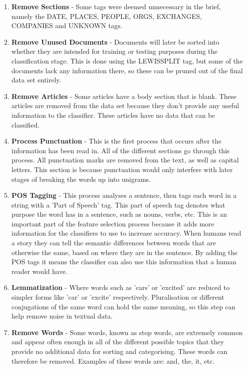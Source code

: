 \documentclass[11pt]{article}
\begin{document}
\begin{enumerate}
\item \textbf{Remove Sections} - Some tags were deemed unnecessary in the brief, namely the DATE, PLACES, PEOPLE, ORGS, EXCHANGES, COMPANIES and UNKNOWN    tags.
\item \textbf{Remove Unused Documents} - Documents will later be sorted into whether they are intended for training or testing purposes during the classification stage. This is done using the LEWISSPLIT tag, but some of the documents lack any information there, so these can be pruned out of the final data set entirely.
\item \textbf{Remove Articles} - Some articles have a body section that is blank. These articles are removed from the data set because they don't provide any useful information to the classifier. These articles have no data that can be classified.
\item \textbf{Process Punctuation} - This is the first process that occurs after the information has been read in. All of the different sections go through this process. All punctuation marks are removed from the text, as well as capital letters. This section is because punctuation would only interfere with later stages of breaking the words up into unigrams.
\item \textbf{POS Tagging}  - This process analyses a sentence, then tags each word in a string with a 'Part of Speech' tag. This part of speech tag denotes what purpose the word has in a sentence, such as nouns, verbs, etc. This is an important part of the feature selection process because it adds more information for the classifiers to use to increase accuracy. When humans read a story they can tell the semantic differences between words that are otherwise the same, based on where they are in the sentence. By adding the POS tags it means the classifier can also use this information that a human reader would have.
\item \textbf{Lemmatization} - Where words such as 'cars' or 'excited' are reduced to simpler forms like 'car' or 'excite' respectively. Pluralisation or different conjugations of the same word can hold the same meaning, so this step can help remove noise in textual data.
\item \textbf{Remove Words} - Some words, known as stop words, are extremely common and appear often enough in all of the different possible topics that they provide no additional data for sorting and categorising. These words can therefore be removed. Examples of these words are: and, the, it, etc.
\end{enumerate}
\end{document}
